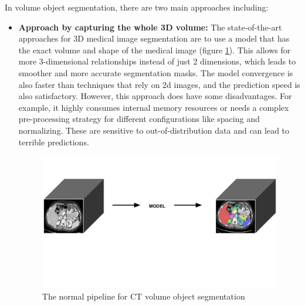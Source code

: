 In volume object segmentation, there are two main approaches including:
\begin{itemize}
    \item \textbf{Approach by capturing the whole 3D volume:} The state-of-the-art approaches for 3D medical image segmentation are to use a model that has the exact volume and shape of the medical image (figure \ref{fig:vos_3d}). This allows for more 3-dimensional relationships instead of just 2 dimensions, which leads to smoother and more accurate segmentation masks. The model convergence is also faster than techniques that rely on 2d images, and the prediction speed is also satisfactory. However, this approach does have some disadvantages. For example, it highly consumes internal memory resources or needs a complex pre-processing strategy for different configurations like spacing and normalizing. These are sensitive to out-of-distribution data and can lead to terrible predictions. 
    
    \begin{figure}[!h]
        \centering
        \includegraphics[width=\textwidth]{content/resources/new_images/intro/3d_approach.pdf}
        \caption{The normal pipeline for CT volume object segmentation}
        \label{fig:vos_3d}
    \end{figure}
    

\end{itemize}
